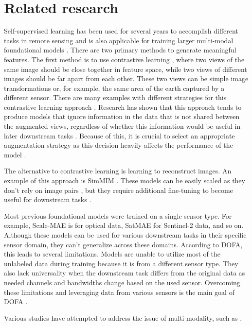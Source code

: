 \section{Related research}
\label{sec:related}



Self-supervised learning has been used for several years to accomplish different tasks in remote sensing and is also applicable for training larger multi-modal foundational models \cite{dofa, satmae, croma}.
There are two primary methods to generate meaningful features. The first method is to use contrastive learning \cite{chen2020simpleframeworkcontrastivelearning}, where two views of the same image should be close together in feature space, while two views of different images should be far apart from each other. These two views can be simple image transformations or, for example, the same area of the earth captured by a different sensor.
There are many examples with different strategies for this contrastive learning approach \cite{satmae, ayush2022geographyawareselfsupervisedlearning}.
Research has shown that this approach tends to produce models that ignore information in the data that is not shared between the augmented views, regardless of whether this information would be useful in later downstream tasks \cite{tian2020makesgoodviewscontrastive}.
Because of this, it is crucial to select an appropriate augmentation strategy as this decision heavily affects the performance of the model \cite{neumann2019indomainrepresentationlearningremote}.

The alternative to contrastive learning is learning to reconstruct images. An example of this approach is SimMIM \cite{xie2022simmimsimpleframeworkmasked}.
These models can be easily scaled as they don’t rely on image pairs \cite{he2021maskedautoencodersscalablevision},
but they require additional fine-tuning to become useful for downstream tasks \cite{lehner2023contrastivetuninglittlehelp}.

Most previous foundational models were trained on a single sensor type. For example, Scale-MAE \cite{scalemae} is for optical data, SatMAE \cite{satmae} for Sentinel-2 data, and so on. Although these models can be used for various downstream tasks in their specific sensor domain, they can't generalize across these domains. According to DOFA, this leads to several limitations. Models are unable to utilize most of the unlabeled data during training because it is from a different sensor type. They also lack universality when the downstream task differs from the original data as needed channels and bandwidths change based on the used sensor. Overcoming these limitations and leveraging data from various sensors is the main goal of DOFA \cite{dofa}.

Various studies have attempted to address the issue of multi-modality, such as \cite{croma, tseng2024lightweightpretrainedtransformersremote, hackstein2024exploringmaskedautoencoderssensoragnostic}.
